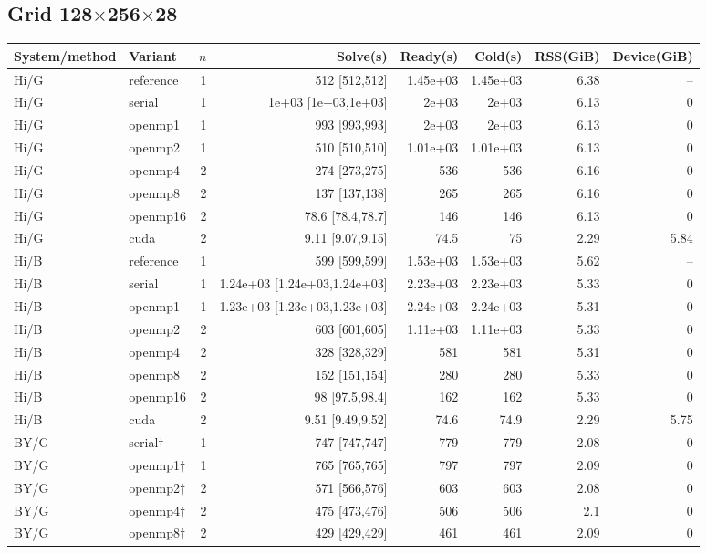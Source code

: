 \documentclass[11pt]{article}
\begin{document}
\subsection{Grid 128$\times$256$\times$28}
\footnotesize
\begin{longtable}{llrrrrrr}
\toprule System/method & Variant & $n$ & Solve(s) & Ready(s) & Cold(s) & RSS(GiB) & Device(GiB)\\
\midrule\endhead
Hi/G & reference & 1 & 512 [512,512] & 1.45e+03 & 1.45e+03 & 6.38 & --\\
Hi/G & serial & 1 & 1e+03 [1e+03,1e+03] & 2e+03 & 2e+03 & 6.13 & 0\\
Hi/G & openmp1 & 1 & 993 [993,993] & 2e+03 & 2e+03 & 6.13 & 0\\
Hi/G & openmp2 & 1 & 510 [510,510] & 1.01e+03 & 1.01e+03 & 6.13 & 0\\
Hi/G & openmp4 & 2 & 274 [273,275] & 536 & 536 & 6.16 & 0\\
Hi/G & openmp8 & 2 & 137 [137,138] & 265 & 265 & 6.16 & 0\\
Hi/G & openmp16 & 2 & 78.6 [78.4,78.7] & 146 & 146 & 6.13 & 0\\
Hi/G & cuda & 2 & 9.11 [9.07,9.15] & 74.5 & 75 & 2.29 & 5.84\\
Hi/B & reference & 1 & 599 [599,599] & 1.53e+03 & 1.53e+03 & 5.62 & --\\
Hi/B & serial & 1 & 1.24e+03 [1.24e+03,1.24e+03] & 2.23e+03 & 2.23e+03 & 5.33 & 0\\
Hi/B & openmp1 & 1 & 1.23e+03 [1.23e+03,1.23e+03] & 2.24e+03 & 2.24e+03 & 5.31 & 0\\
Hi/B & openmp2 & 2 & 603 [601,605] & 1.11e+03 & 1.11e+03 & 5.33 & 0\\
Hi/B & openmp4 & 2 & 328 [328,329] & 581 & 581 & 5.31 & 0\\
Hi/B & openmp8 & 2 & 152 [151,154] & 280 & 280 & 5.33 & 0\\
Hi/B & openmp16 & 2 & 98 [97.5,98.4] & 162 & 162 & 5.33 & 0\\
Hi/B & cuda & 2 & 9.51 [9.49,9.52] & 74.6 & 74.9 & 2.29 & 5.75\\
BY/G & serial$\dagger$ & 1 & 747 [747,747] & 779 & 779 & 2.08 & 0\\
BY/G & openmp1$\dagger$ & 1 & 765 [765,765] & 797 & 797 & 2.09 & 0\\
BY/G & openmp2$\dagger$ & 2 & 571 [566,576] & 603 & 603 & 2.08 & 0\\
BY/G & openmp4$\dagger$ & 2 & 475 [473,476] & 506 & 506 & 2.1 & 0\\
BY/G & openmp8$\dagger$ & 2 & 429 [429,429] & 461 & 461 & 2.09 & 0\\

\end{longtable}
\end{document}
